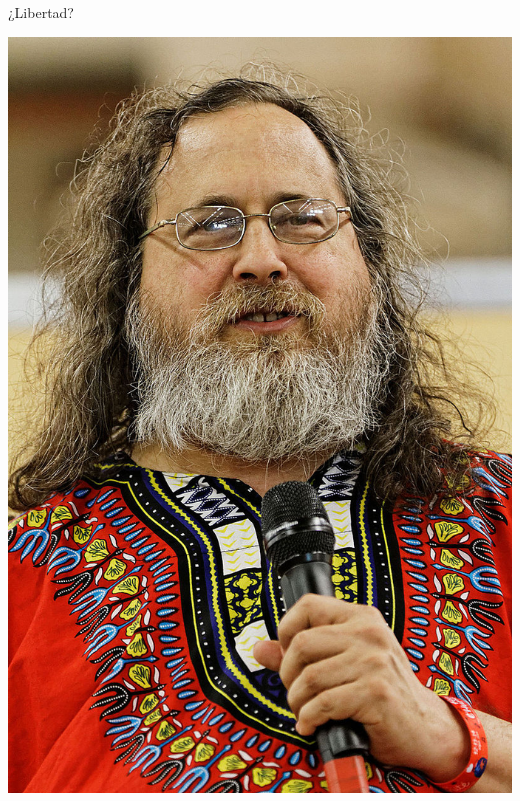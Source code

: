 \documentclass{beamer}
\begin{document}
\begin{frame}{¿Libertad?}
  \begin{minipage}{0.45\textwidth}
        \centering
        \includegraphics[width=\linewidth]{images/rms.jpg}
    \end{minipage}
    \hfill
    \begin{minipage}{0.45\textwidth}
        \centering

\end{minipage}
\end{frame}
\end{document}
